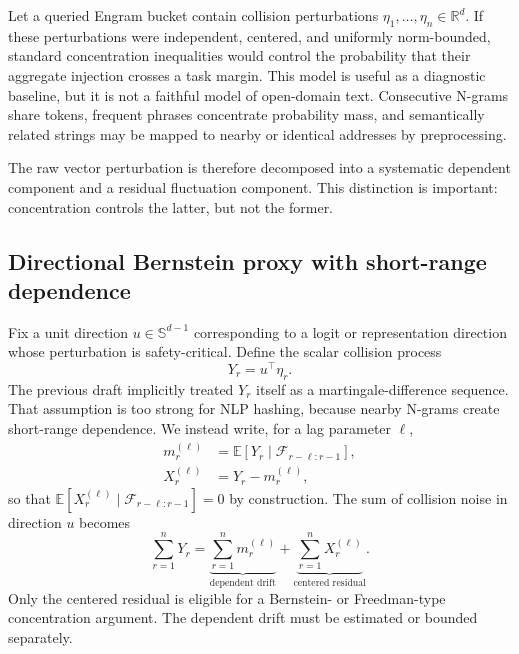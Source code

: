 \documentclass[11pt]{article}
\newcommand{\E}{\mathbb{E}}
\begin{document}
Let a queried Engram bucket contain collision perturbations $\eta_1,\ldots,\eta_n\in\mathbb{R}^d$. If these perturbations were independent, centered, and uniformly norm-bounded, standard concentration inequalities would control the probability that their aggregate injection crosses a task margin. This model is useful as a diagnostic baseline, but it is not a faithful model of open-domain text. Consecutive N-grams share tokens, frequent phrases concentrate probability mass, and semantically related strings may be mapped to nearby or identical addresses by preprocessing.

The raw vector perturbation is therefore decomposed into a systematic dependent component and a residual fluctuation component. This distinction is important: concentration controls the latter, but not the former.

\subsection{Directional Bernstein proxy with short-range dependence}

Fix a unit direction $u\in\mathbb{S}^{d-1}$ corresponding to a logit or representation direction whose perturbation is safety-critical. Define the scalar collision process
\begin{equation}
Y_r = u^\top \eta_r .
\end{equation}
The previous draft implicitly treated $Y_r$ itself as a martingale-difference sequence. That assumption is too strong for NLP hashing, because nearby N-grams create short-range dependence. We instead write, for a lag parameter $\ell$,
\begin{align}
m_r^{(\ell)} &= \E\!\left[Y_r\mid \mathcal{F}_{r-\ell:r-1}\right], \\
X_r^{(\ell)} &= Y_r - m_r^{(\ell)},
\end{align}
so that $\E[X_r^{(\ell)}\mid \mathcal{F}_{r-\ell:r-1}]=0$ by construction. The sum of collision noise in direction $u$ becomes
\begin{equation}
\sum_{r=1}^{n}Y_r
= \underbrace{\sum_{r=1}^{n}m_r^{(\ell)}}_{\text{dependent drift}}
+ \underbrace{\sum_{r=1}^{n}X_r^{(\ell)}}_{\text{centered residual}}.
\end{equation}
Only the centered residual is eligible for a Bernstein- or Freedman-type concentration argument. The dependent drift must be estimated or bounded separately.
\end{document}

